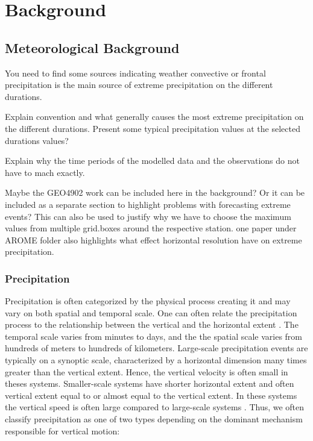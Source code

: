 \section{Background}
\label{sec:background}

\subsection{Meteorological Background}

You need to find some sources indicating weather convective or frontal precipitation is the main source of extreme precipitation on the different durations. 

Explain convention and what generally causes the most extreme precipitation on the different durations. Present some typical precipitation values at the selected durations values?

Explain why the time periods of the modelled data and the observations do not have to mach exactly. 

Maybe the GEO4902 work can be included here in the background? Or it can be included as a separate section to highlight problems with forecasting extreme events? This can also be used to justify why we have to choose the maximum values from multiple grid.boxes around the respective station.   
one paper under AROME folder also highlights what effect horizontal resolution have on extreme precipitation. 

\subsubsection{Precipitation}

Precipitation is often categorized by the physical process creating it and may vary on both spatial and temporal scale. One can often relate the precipitation process to the relationship between the vertical and the horizontal extent \cite{rogers}. The temporal scale varies from minutes to days, and the the spatial scale varies from hundreds of meters to hundreds of kilometers. Large-scale precipitation events are typically on a synoptic scale, characterized by a horizontal dimension many times greater than the vertical extent. Hence, the vertical velocity is often small in theses systems. Smaller-scale systems have shorter horizontal extent and often vertical extent equal to or almost equal to the vertical extent. In these systems the vertical speed is often large compared to large-scale systems \cite{rogers}. Thus, we often classify precipitation as one of two types depending on the dominant mechanism responsible for vertical motion:

